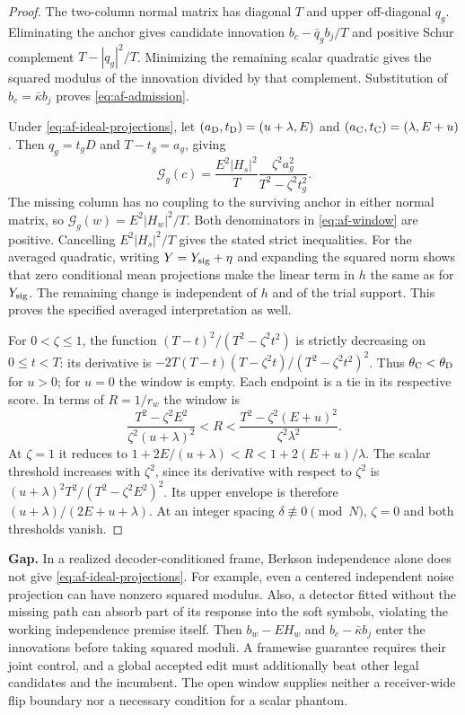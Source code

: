 \begin{proof}
The two-column normal matrix has diagonal $T$ and upper off-diagonal
$q_g$. Eliminating the anchor gives candidate innovation
$b_c-\bar q_g b_j/T$ and positive Schur complement $T-|q_g|^2/T$.
Minimizing the remaining scalar quadratic gives the squared modulus of
the innovation divided by that complement. Substitution of
$b_c=\bar\kappa b_j$ proves \eqref{eq:af-admission}.

Under \eqref{eq:af-ideal-projections}, let
$(a_{\rm D},t_{\rm D})=(u+\lambda,E)$ and
$(a_{\rm C},t_{\rm C})=(\lambda,E+u)$.
Then $q_g=t_gD$ and $T-t_g=a_g$, giving
\[
 \mathcal G_g(c)=\frac{E^2|H_s|^2}{T}
                  \frac{\zeta^2a_g^2}{T^2-\zeta^2t_g^2}.
\]
The missing column has no coupling to the surviving anchor in either
normal matrix, so $\mathcal G_g(w)=E^2|H_w|^2/T$.
Both denominators in \eqref{eq:af-window} are positive. Cancelling
$E^2|H_s|^2/T$ gives the stated strict inequalities. For the averaged
quadratic, writing $Y=Y_{\rm sig}+\eta$ and expanding the squared norm
shows that zero conditional mean projections make the linear term in
$h$ the same as for $Y_{\rm sig}$. The remaining change is independent
of $h$ and of the trial support. This proves the specified averaged
interpretation as well.

For $0<\zeta\le1$, the function
$(T-t)^2/(T^2-\zeta^2t^2)$ is strictly decreasing on $0\le t<T$:
its derivative is
$-2T(T-t)(T-\zeta^2t)/(T^2-\zeta^2t^2)^2$.
Thus $\theta_{\rm C}<\theta_{\rm D}$ for $u>0$; for $u=0$ the window
is empty. Each endpoint is a tie in its respective score. In terms of
$R=1/r_w$ the window is
\[
 \frac{T^2-\zeta^2 E^2}{\zeta^2(u+\lambda)^2}
 <R<
 \frac{T^2-\zeta^2(E+u)^2}{\zeta^2\lambda^2}.
\]
At $\zeta=1$ it reduces to
$1+2E/(u+\lambda)<R<1+2(E+u)/\lambda$.
The scalar threshold increases with $\zeta^2$, since its derivative
with respect to $\zeta^2$ is
$(u+\lambda)^2T^2/(T^2-\zeta^2E^2)^2$. Its upper envelope is therefore
$(u+\lambda)/(2E+u+\lambda)$. At an integer spacing
$\delta\not\equiv0\pmod N$, $\zeta=0$ and both thresholds vanish.
\end{proof}

\textbf{Gap.} In a realized decoder-conditioned frame, Berkson
independence alone does not give \eqref{eq:af-ideal-projections}.
For example, even a centered independent noise projection can have
nonzero squared modulus. Also, a detector fitted without the missing
path can absorb part of its response into the soft symbols, violating
the working independence premise itself. Then $b_w-EH_w$ and
$b_c-\bar\kappa b_j$ enter the innovations before taking squared
moduli. A framewise guarantee requires their joint control, and a
global accepted edit must additionally beat other legal candidates and
the incumbent. The open window supplies neither a receiver-wide flip
boundary nor a necessary condition for a scalar phantom.

